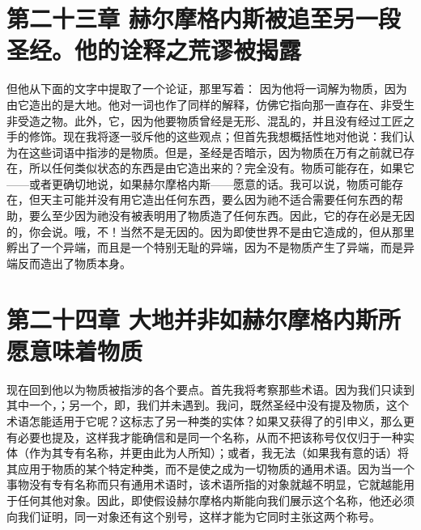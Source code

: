 
\section{第二十三章 赫尔摩格内斯被追至另一段圣经。他的诠释之荒谬被揭露}

但他从下面的文字中提取了一个论证，那里写着：  因为他将一词解为物质，因为由它造出的是大地。他对一词也作了同样的解释，仿佛它指向那一直存在、非受生非受造之物。此外，它，因为他要物质曾经是无形、混乱的，并且没有经过工匠之手的修饰。现在我将逐一驳斥他的这些观点；但首先我想概括性地对他说：我们认为在这些词语中指涉的是物质。但是，圣经是否暗示，因为物质在万有之前就已存在，所以任何类似状态的东西是由它造出来的？完全没有。物质可能存在，如果它——或者更确切地说，如果赫尔摩格内斯——愿意的话。我可以说，物质可能存在，但天主可能并没有用它造出任何东西，要么因为祂不适合需要任何东西的帮助，要么至少因为祂没有被表明用了物质造了任何东西。因此，它的存在必是无因的，你会说。哦，不！当然不是无因的。因为即使世界不是由它造成的，但从那里孵出了一个异端，而且是一个特别无耻的异端，因为不是物质产生了异端，而是异端反而造出了物质本身。\par


\section{第二十四章 大地并非如赫尔摩格内斯所愿意味着物质}

现在回到他以为物质被指涉的各个要点。首先我将考察那些术语。因为我们只读到其中一个，；另一个，即，我们并未遇到。我问，既然圣经中没有提及物质，这个术语怎能适用于它呢？这标志了另一种类的实体？如果又获得了的引申义，那么更有必要也提及，这样我才能确信和是同一个名称，从而不把该称号仅仅归于一种实体（作为其专有名称，并更由此为人所知）；或者，我无法（如果我有意的话）将其应用于物质的某个特定种类，而不是使之成为一切物质的通用术语。因为当一个事物没有专有名称而只有通用术语时，该术语所指的对象就越不明显，它就越能用于任何其他对象。因此，即使假设赫尔摩格内斯能向我们展示这个名称，他还必须向我们证明，同一对象还有这个别号，这样才能为它同时主张这两个称号。\par

